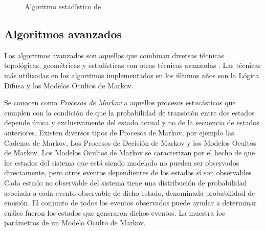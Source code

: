 \begin{figure}[h]
\centering
\begin{singlespace}
\end{singlespace}
\caption{Algoritmo estadístico de \citep{ochieng2009map}}
\label{fig:algoritmo-estadistico} 
\end{figure}

\subsection{Algoritmos avanzados}

Los algoritmos avanzados son aquellos que combinan diversas técnicas topológicas, geométricas y estadísticas con otras técnicas avanzadas \citep{quddus2007current}. Las técnicas más utilizadas en los algoritmos implementados en los últimos años son la Lógica Difusa y los Modelos Ocultos de Markov.

Se conocen como \emph{Procesos de Markov} a aquellos procesos estocásticos que cumplen con la condición de que la probabilidad de transición entre dos estados depende única y exclusivamente del estado actual y no de la secuencia de estados anteriores. Existen diversos tipos de Procesos de Markov, por ejemplo las Cadenas de Markov, Los Procesos de Decisión de Markov y los Modelos Ocultos de Markov. Los Modelos Ocultos de Markov se caracterizan por el hecho de que los estados del sistema que está siendo modelado no pueden ser observados directamente, pero otros eventos dependientes de los estados sí son observables \citep{blunsom2004hidden}. Cada estado no observable del sistema tiene una distribución de probabilidad asociada a cada evento observable de dicho estado, denominada probabilidad de emisión. El conjunto de todos los eventos observados puede ayudar a determinar cuáles fueron los estados que generaron dichos eventos. La  muestra los parámetros de un Modelo Oculto de Markov.

